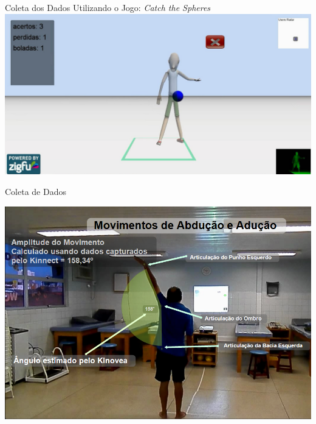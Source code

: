 \documentclass{beamer}
\begin{document}
\begin{frame}{Coleta dos Dados Utilizando o Jogo: \textit{Catch the Spheres}}
      \center \includegraphics[height=2.2 in]{img/catch-the-spheres.png}
\end{frame}

\begin{frame}{Coleta de Dados}
  \begin{block}{}
  \center \includegraphics[height=2.4 in]{img/capturaducaokinnect.png} 
  \end{block}
\end{frame}

% 
% 
% 
% 
\end{document}
